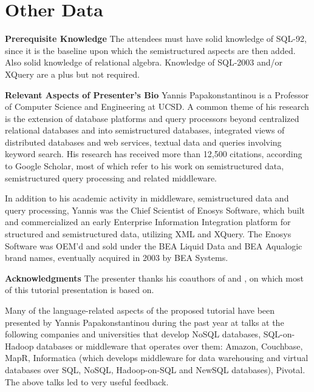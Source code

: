 

\section{Other Data}
\label{sec:duration}

\noindent \textbf{Prerequisite Knowledge} 
\label{sec:audience}
The attendees must have solid knowledge of SQL-92, since it is the baseline upon which the semistructured aspects are then added. Also solid knowledge of relational algebra. Knowledge of SQL-2003 and/or XQuery are a plus but not required.

\noindent \textbf{Relevant Aspects of Presenter's Bio} 
Yannis Papakonstantinou is a Professor of Computer Science and Engineering at UCSD. A common theme of his research is the extension of database platforms and query processors beyond centralized relational databases and into semistructured databases, integrated views of distributed databases and web services, textual data and queries involving keyword search. His research has received more than 12,500 citations, according to Google Scholar, most of which refer to his work on semistructured data, semistructured query processing and related middleware.

In addition to his academic activity in middleware, semistructured data and query processing, Yannis was the Chief Scientist of Enosys Software, which built and commercialized an early Enterprise Information Integration platform for structured and semistructured data, utilizing XML and XQuery. The Enosys Software was OEM'd and sold under the BEA Liquid Data and BEA Aqualogic brand names, eventually acquired in 2003 by BEA Systems.

\noindent \textbf{Acknowledgments} 
The presenter thanks his coauthors of \cite{sqlpp-extended-corr-2015} and \cite{sqlpp-survey-2015}, on which most of this tutorial presentation is based on.

Many of the language-related aspects of the proposed tutorial have been presented by Yannis Papakonstantinou during the past year at talks at the following companies and universities that develop NoSQL databases,  SQL-on-Hadoop databases or middleware that operates over them: Amazon, Couchbase, MapR, Informatica (which develops middleware for data warehousing and virtual databases over SQL, NoSQL, Hadoop-on-SQL and NewSQL databases), Pivotal. The above talks led to very useful feedback.

